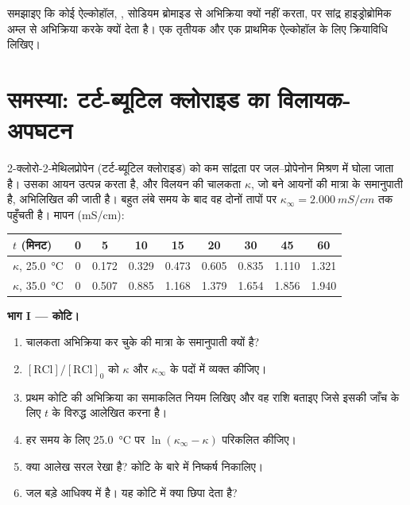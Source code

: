 \begin{exercise}[$\star\star\star$]\label{exo:b1:nucleophilic-substitution:12}
समझाइए कि कोई ऐल्कोहॉल, , सोडियम ब्रोमाइड से अभिक्रिया क्यों नहीं करता, पर
सांद्र हाइड्रोब्रोमिक अम्ल से अभिक्रिया करके  क्यों देता है। एक तृतीयक और एक
प्राथमिक ऐल्कोहॉल के लिए क्रियाविधि लिखिए।
\end{exercise}

\section{समस्या: टर्ट-ब्यूटिल क्लोराइड का विलायक-अपघटन}

\begin{problem}
\label{pb:b1:nucleophilic-substitution:1}
2-क्लोरो-2-मेथिलप्रोपेन (टर्ट-ब्यूटिल क्लोराइड) को कम
सांद्रता पर जल--प्रोपेनोन मिश्रण में घोला जाता है। उसका 
 आयन उत्पन्न करता है, और
विलयन की चालकता $\kappa$, जो बने आयनों की मात्रा के
समानुपाती है, अभिलिखित की जाती है। बहुत लंबे समय के बाद वह दोनों तापों पर
$\kappa_\infty = \qty{2.000}{mS/cm}$ तक पहुँचती है। मापन
(\unit{mS/cm}):

\begin{center}
\begin{tabular}{lcccccccc}
\hline
$t$ (मिनट) & 0 & 5 & 10 & 15 & 20 & 30 & 45 & 60 \\
\hline
$\kappa$, \qty{25.0}{\celsius} & 0 & 0.172 & 0.329 & 0.473 & 0.605 & 0.835 & 1.110 & 1.321 \\
$\kappa$, \qty{35.0}{\celsius} & 0 & 0.507 & 0.885 & 1.168 & 1.379 & 1.654 & 1.856 & 1.940 \\
\hline
\end{tabular}
\end{center}

\medskip
\noindent\textbf{भाग I --- कोटि।}
\begin{enumerate}
  \item चालकता अभिक्रिया कर चुके  की मात्रा के समानुपाती
        क्यों है?
  \item $[\mathrm{RCl}]/[\mathrm{RCl}]_0$ को $\kappa$ और
        $\kappa_\infty$ के पदों में व्यक्त कीजिए।
  \item प्रथम कोटि की अभिक्रिया का समाकलित नियम लिखिए और वह
        राशि बताइए जिसे इसकी जाँच के लिए $t$ के विरुद्ध आलेखित करना है।
  \item हर समय के लिए \qty{25.0}{\celsius} पर $\ln(\kappa_\infty - \kappa)$
        परिकलित कीजिए।
  \item क्या आलेख सरल रेखा है? कोटि के बारे में निष्कर्ष निकालिए।
  \item जल बड़े आधिक्य में है। यह कोटि में क्या छिपा देता है?
\end{enumerate}


\end{problem}
